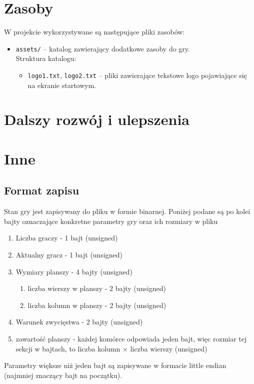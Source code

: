 \documentclass{article}
\begin{document}
\section{Zasoby}

W projekcie wykorzystywane są następujące pliki zasobów:
    \begin{itemize}
    \item \texttt{assets/} – katalog zawierający dodatkowe zasoby do gry.\\
    Struktura katalogu:
        \begin{itemize}
            \item \texttt{logo1.txt}, \texttt{logo2.txt} – pliki zawierające tekstowe logo pojawiające się na ekranie startowym.
        \end{itemize}
    \end{itemize}

\section{Dalszy rozwój i ulepszenia}

\section{Inne}

\subsection{Format zapisu}

Stan gry jest zapisywany do pliku w formie binarnej. Poniżej podane są po kolei bajty oznaczające konkretne parametry gry oraz ich rozmiary w pliku

\begin{enumerate}
\item Liczba graczy - 1 bajt (unsigned)
\item Aktualny gracz - 1 bajt (unsigned)
\item Wymiary planszy - 4 bajty (unsigned)
  \begin{enumerate}
    \item liczba wierszy w planszy - 2 bajty (unsigned)
    \item liczba kolumn w planszy - 2 bajty (unsigned)
  \end{enumerate}
\item Warunek zwycięstwa - 2 bajty (unsigned)
\item zawartość planszy - każdej komórce odpowiada jeden bajt, więc rozmiar tej sekcji w bajtach, to liczba kolumn $\times$ liczba wierszy (unsigned)
\end{enumerate}

Parametry większe niż jeden bajt są zapisywane w formacie little endian (najmniej znaczący bajt na początku).
\end{document}
